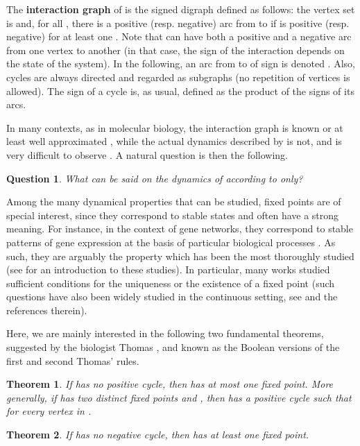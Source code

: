 \documentclass[11pt,a4paper]{article}
\newtheorem{question}{Question}
\newtheorem{theorem}{Theorem}
\begin{document}
The {\bf interaction graph} of  is the signed digraph  defined as follows: the vertex set is  and, for all , there is a positive (resp. negative) arc from  to  if  is positive (resp. negative) for at least one . Note that  can have both a positive and a negative arc from one vertex to another (in that case, the sign of the interaction depends on the state  of the system). In the following, an arc from  to  of sign  is denoted . Also, cycles are always directed and regarded as subgraphs (no repetition of vertices is allowed). The sign of a cycle is, as usual, defined as the product of the signs of its arcs.
 
\medskip 
In many contexts, as in molecular biology, the interaction graph is known  or at least well
approximated , while the actual dynamics described by  is not, and is very difficult to observe \cite{TK01,N15}. A natural question is then the following. 

\begin{question}\label{question} 
What can be said on the dynamics of  according to  only? 
\end{question}

Among the many dynamical properties that can be studied, fixed points are of special interest, since they correspond to stable states and often have a strong meaning. For instance, in the context of gene networks, they correspond to stable patterns of gene expression at the basis of particular biological processes \cite{TA90,A04}. As such, they are arguably the property which has been the most thoroughly studied (see \cite{R86} for an introduction to these studies). In particular, many works studied sufficient conditions for the uniqueness or the existence of a fixed point \cite{SD05,A08,RRT08,RC07,R10,R15} (such questions have also been widely studied in the continuous setting, see \cite{KST07} and the references therein). 

\medskip
Here, we are mainly interested in the following two fundamental theorems, suggested by the biologist Thomas \cite{T81}, and known as the Boolean versions of the first and second Thomas' rules.

\begin{theorem}\label{rule1}
If  has no positive cycle, then  has at most one fixed point. More generally, if  has two distinct fixed points  and , then  has a positive cycle  such that  for every vertex  in .
\end{theorem}

\begin{theorem}\label{rule2}
If  has no negative cycle, then  has at least one fixed point.
\end{theorem}
\end{document}
